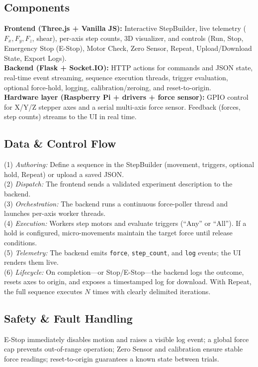\documentclass[
    twocolumn,
    fontsize = 10pt,
    parskip = half+,
    headings = small,
    headwidth = text,
    footwidth = text,
]{scrartcl}
\begin{document}
\subsection{Components}
\textbf{Frontend (Three.js + Vanilla JS):} Interactive StepBuilder, live telemetry ($F_x, F_y, F_z$, shear), per-axis step counts, 3D visualizer, and controls (Run, Stop, Emergency Stop (E-Stop), Motor Check, Zero Sensor, Repeat, Upload/Download State, Export Logs).\\
\textbf{Backend (Flask + Socket.IO):} HTTP actions for commands and JSON state, real-time event streaming, sequence execution threads, trigger evaluation, optional force-hold, logging, calibration/zeroing, and reset-to-origin.\\
\textbf{Hardware layer (Raspberry Pi + drivers + force sensor):} GPIO control for X/Y/Z stepper axes and a serial multi-axis force sensor. Feedback (forces, step counts) streams to the UI in real time.

\subsection{Data \& Control Flow}
(1) \emph{Authoring:} Define a sequence in the StepBuilder (movement, triggers, optional hold, Repeat) or upload a saved JSON.\\
(2) \emph{Dispatch:} The frontend sends a validated experiment description to the backend.\\
(3) \emph{Orchestration:} The backend runs a continuous force-poller thread and launches per-axis worker threads.\\
(4) \emph{Execution:} Workers step motors and evaluate triggers (``Any'' or ``All''). If a hold is configured, micro-movements maintain the target force until release conditions.\\
(5) \emph{Telemetry:} The backend emits \texttt{force}, \texttt{step\_count}, and \texttt{log} events; the UI renders them live.\\
(6) \emph{Lifecycle:} On completion—or Stop/E-Stop—the backend logs the outcome, resets axes to origin, and exposes a timestamped log for download. With Repeat, the full sequence executes $N$ times with clearly delimited iterations.

\subsection{Safety \& Fault Handling}
E-Stop immediately disables motion and raises a visible log event; a global force cap prevents out-of-range operation; Zero Sensor and calibration ensure stable force readings; reset-to-origin guarantees a known state between trials.
\end{document}
